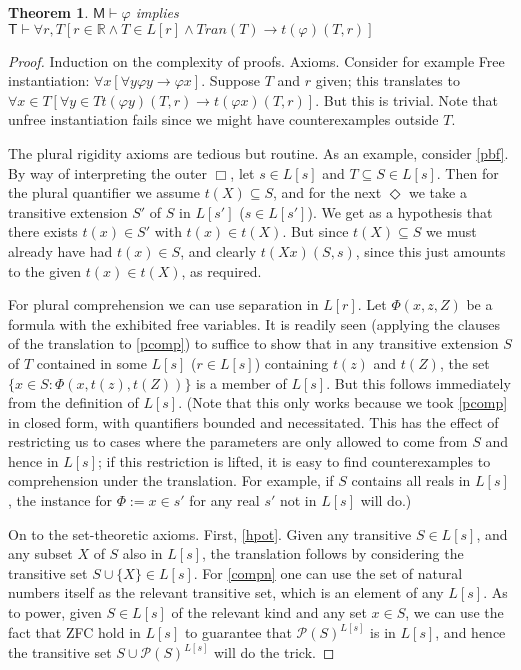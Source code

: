 \documentclass{article}
\newtheorem{Theorem}{Theorem}[section]
\theoremstyle{definition}
\begin{document}
\begin{Theorem}
  $\mathsf{M} \vdash \varphi$ implies $\mathsf{T} \vdash \forall r, T [r \in \mathbb{R} \wedge T \in L[r] \wedge Tran(T) \rightarrow t(\varphi)(T, r)]$  
\end{Theorem}
\begin{proof}
    Induction on the complexity of proofs. Axioms. Consider for example 
    Free instantiation: $\forall x[\forall y \varphi y \rightarrow \varphi x]$.
    Suppose $T$ and $r$ given; this translates to $\forall x \in T [ \forall y \in T t(\varphi y)(T, r) \rightarrow t(\varphi x) (T, r)]$.
    But this is trivial. Note that unfree instantiation fails since we might have counterexamples 
    outside $T$.

    The plural rigidity axioms are tedious but routine. As an example, consider \eqref{pbf}.
    By way of interpreting the outer $\Box$, let $s \in L[s]$ and $T\subseteq S \in L[s]$. 
    Then for the plural quantifier we assume $t(X) \subseteq S$, and for the next $\Diamond$ 
    we take a transitive extension $S'$ of $S$ in $L[s']$ ($s \in L[s']$). 
    We get as a hypothesis that there exists $t(x) \in S'$ with $t(x) \in t(X)$. 
    But since $t(X) \subseteq S$ we must already have had $t(x) \in S$, 
    and clearly $t(Xx)(S, s)$, since this just amounts 
    to the given $t(x) \in t(X)$, as required.

    For plural comprehension 
    we can use separation in $L[r]$. Let $\Phi(x, z, Z)$ be a formula with the exhibited 
    free variables. It is readily seen 
    (applying the clauses of the translation to \eqref{pcomp}) 
    to suffice to show that 
    in any transitive extension $S$ of $T$ contained in some $L[s]$ ($r \in L[s]$) 
    containing $t(z)$ and $t(Z)$, the set $\{x \in S : \Phi(x, t(z), t(Z))\}$ is a member of $L[s]$. 
    But this follows immediately from the definition of $L[s]$.
    (Note that this only works because we took \eqref{pcomp} in closed form, with quantifiers 
    bounded and necessitated. This has the effect of restricting us to cases where the parameters
    are only allowed to come from $S$ and hence in $L[s]$; if this restriction is lifted, it is 
    easy to find counterexamples to comprehension under the translation. For example, if $S$ contains 
    all reals in $L[s]$, the instance for $\Phi := x \in s'$ for any real $s'$ not in $L[s]$ will do.) 

    On to the set-theoretic axioms. First, \eqref{hpot}. Given any transitive $S \in L[s]$, and any 
    subset $X$ of $S$ also in $L[s]$, the translation follows by considering the transitive set 
    $S \cup \{X\} \in L[s]$. For \eqref{compn} one can use the set of natural numbers itself as the 
    relevant transitive set, which is an element of any $L[s]$. 
    As to power, given $S \in L[s]$ of the relevant kind and any set $x \in S$, we can use the 
    fact that ZFC hold in $L[s]$ to guarantee that $\mathcal{P}(S)^{L[s]}$ is in $L[s]$, and hence 
    the transitive set $S \cup \mathcal{P}(S)^{L[s]}$ will do the trick.


\end{proof}
\end{document}
